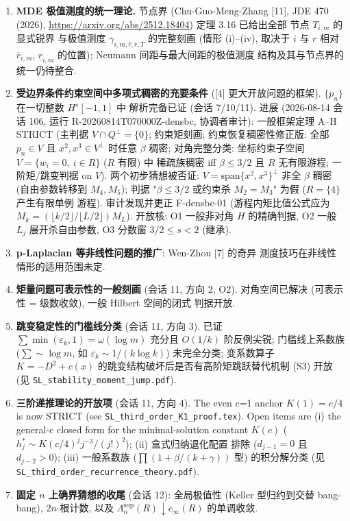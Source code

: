 \documentclass[UTF8]{ctexart}
\begin{document}
\begin{enumerate}
		$q\ge0$ (Gan-Zheng-Li-Shao 线 [8]) 与变号权重的最优常数与极值
		结构仍待确定.
	\item \textbf{MDE 极值测度的统一理论.}
		节点界 (Chu-Guo-Meng-Zhang [11], JDE 470 (2026),
		\url{https://arxiv.org/abs/2512.18404}) 定理 3.16 已给出全部
		节点 $T_{i,m}$ 的显式锐界
		与极值测度 $\gamma_{i,m,\hat r,\check r,T}$ 的完整刻画
		(情形 (i)--(iv), 取决于 $i$ 与 $r$ 相对 $\overline r_{i,m}$,
		$\underline r_{i,m}$ 的位置); Neumann 间距与最大间距的极值测度
		结构及其与节点界的统一仍待整合.
	\item \textbf{受边界条件约束空间中多项式稠密的充要条件}
		([4] 更大开放问题的框架). $\{p_n\}$ 在一切整数 $H^s[-1,1]$ 中
		解析完备已证 (会话 7/10/11). 进展 (2026-08-14 会话 106, 运行
		R-20260814T070000Z-densbc, 协调者审计): 一般框架定理 A--H STRICT
		(主判据 $V\cap Q^\perp=\{0\}$; 约束矩刻画; 约束恢复稠密性修正版:
		全部 $p_n\in V$ 且 $x^2,x^3\in V^\perp$ 时任意 $\beta$ 稠密;
		对角完整分类: 坐标约束子空间 $V=\{w_i=0,\ i\in R\}$ ($R$ 有限) 中
		稀疏族稠密 iff $\beta\le3/2$ 且 $R$ 无有限游程; 一阶矩/跳变判据
		on $V$). 两个初步猜想被否证: $V=\mathrm{span}\{x^2,x^3\}^\perp$
		非全 $\beta$ 稠密 (自由参数转移到 $M_4,M_5$); 判据
		"$\beta\le3/2$ 或约束杀 $M_2=M_3$" 为假 ($R=\{4\}$ 产生有限单例
		游程). 审计发现并更正 F-densbc-01 (游程内矩比值公式应为
		$M_k=(\lfloor k/2\rfloor/\lfloor L/2\rfloor)M_L$). 开放核:
		O1 一般非对角 $H$ 的精确判据, O2 一般 $L_j$ 展开杀自由参数,
		O3 分数窗 $3/2\le s<2$ (继承).
	\item \textbf{p-Laplacian 等非线性问题的推广}: Wen-Zhou [7] 的奇异
		测度技巧在非线性情形的适用范围未定.
	\item \textbf{矩量问题可表示性的一般刻画} (会话 11, 方向 2, O2).
		对角空间已解决 (可表示性 = 级数收敛), 一般 Hilbert 空间的闭式
		判据开放.
	\item \textbf{跳变稳定性的门槛线分类} (会话 11, 方向 3).
		已证 $\sum\min(\varepsilon_k,1) = \omega(\log m)$ 充分且 $O(1/k)$
		阶反例尖锐; 门槛线上系数族 ($\sum\sim\log m$, 如
		$\varepsilon_k\sim1/(k\log k)$) 未完全分类; 变系数算子
		$K = -D^2 + c(x)$ 的跳变结构破坏后是否有高阶矩跳跃替代机制
		(S3) 开放 (见 \texttt{SL\_stability\_moment\_jump.pdf}).
	\item \textbf{三阶递推理论的开放项} (会话 11, 方向 4).
		The even c=1 anchor $K(1)=e/4$ is now STRICT (see
		\texttt{SL\_third\_order\_K1\_proof.tex}). Open items are (i) the
		general-c closed form for the minimal-solution constant $K(c)$
		($h^*_j \sim K(c/4)^j j^{-3}/(j!)^2$); (ii) 盒式归纳退化配置
		排除 ($d_{j-1}=0$ 且 $d_{j-2}>0$); (iii) 一般系数族
		($\prod(1+\beta/(k+\gamma))$ 型) 的积分解分类
		(见 \texttt{SL\_third\_order\_recurrence\_theory.pdf}).
	\item \textbf{固定 $n$ 上确界猜想的收尾} (会话 12): 全局极值性
		(Keller 型归约到交替 bang-bang), $2n$-根计数, 以及
		$\Lambda_n^{\sup}(R)\downarrow c_\infty(R)$ 的单调收敛.
\end{enumerate}
\end{document}
